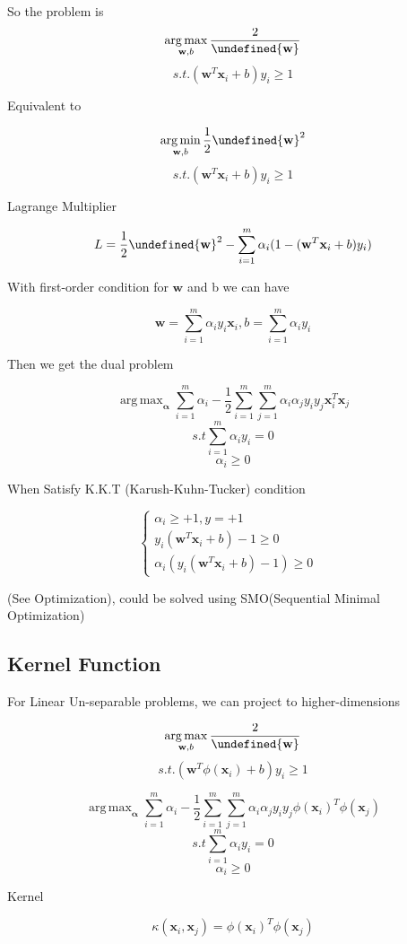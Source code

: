 \documentclass[11pt, openany]{book}              %
\let\norm\undefined %
\DeclarePairedDelimiter\norm{\lVert}{\rVert}
\DeclareMathOperator*{\argmax}{arg\,max}  %
\DeclareMathOperator*{\argmin}{arg\,min}  %
\begin{document}
So the problem is
$$ \argmax_{\mathbf{w},b} \frac{2}{\norm{\mathbf{w}}}$$
$$s.t. (\mathbf{w}^T\mathbf{x}_i + b)y_i \geq 1$$

Equivalent to

$$ \argmin_{\mathbf{w},b} \frac{1}{2}\norm{\mathbf{w}}^2$$
$$s.t. (\mathbf{w}^T\mathbf{x}_i + b)y_i \geq 1$$

Lagrange Multiplier

$$L = \frac{1}{2}\norm{\mathbf{w}}^2 - \sum_{i=1}^m\alpha_i(1 - (\mathbf{w}^T\mathbf{x}_i + b)y_i)$$

With first-order condition for $\mathbf{w}$ and b we can have

$$\mathbf{w} = \sum_{i=1}^m \alpha_i y_i \mathbf{x}_i, b = \sum_{i=1}^m \alpha_i y_i$$

Then we get the dual problem

$$\argmax_{\boldsymbol{\alpha}}  \sum_{i=1}^m \alpha_i - \frac{1}{2} \sum_{i=1}^m \sum_{j=1}^m \alpha_i \alpha_j y_i y_j \mathbf{x}_i^T\mathbf{x}_j$$
$$s.t \sum_{i=1}^m \alpha_i y_i = 0$$
$$ \alpha_i \geq 0$$

When Satisfy K.K.T (Karush-Kuhn-Tucker) condition 

$$\left\{
         \begin{array}{lr}
             \alpha_i \geq +1,  y = +1 &  \\
              y_i(\mathbf{w}^T\mathbf{x}_i + b) - 1 \geq 0 \\
              \alpha_i( y_i(\mathbf{w}^T\mathbf{x}_i + b) - 1 ) \geq 0 
             \end{array}
   \right.$$ 


(See Optimization), could be solved using SMO(Sequential Minimal Optimization)

\subsection{Kernel Function}

For Linear Un-separable problems, we can project to higher-dimensions

$$ \argmax_{\mathbf{w},b} \frac{2}{\norm{\mathbf{w}}}$$
$$s.t. (\mathbf{w}^T\phi(\mathbf{x}_i)+ b)y_i \geq 1$$

$$\argmax_{\boldsymbol{\alpha}}  \sum_{i=1}^m \alpha_i - \frac{1}{2} \sum_{i=1}^m \sum_{j=1}^m \alpha_i \alpha_j y_i y_j \phi(\mathbf{x}_i)^T\phi(\mathbf{x}_j)$$
$$s.t \sum_{i=1}^m \alpha_i y_i = 0$$
$$ \alpha_i \geq 0$$

Kernel

$$\kappa(\mathbf{x}_i, \mathbf{x}_j ) = \phi(\mathbf{x}_i)^T\phi(\mathbf{x}_j)$$
\end{document}
